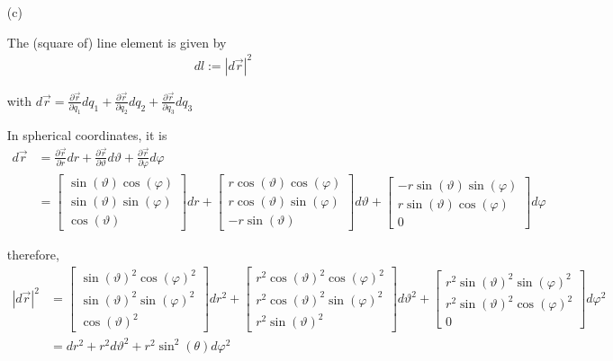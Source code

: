 \documentclass[11pt,a4paper]{article}
\begin{document}
\newpage

\begin{enumerate}
\item[(c)]

The (square of) line element is given by
\begin{align*}
dl:=|d\vec{r}|^2
\end{align*}

with $d\vec{r}=\frac{\partial\vec{r}}{\partial q_1}dq_1+\frac{\partial\vec{r}}{\partial q_2}dq_2+\frac{\partial\vec{r}}{\partial q_3}dq_3$

In spherical coordinates, it is
\begin{align*}
d\vec{r}
&=\frac{\partial\vec{r}}{\partial r}dr+\frac{\partial\vec{r}}{\partial \vartheta}d\vartheta+\frac{\partial\vec{r}}{\partial \varphi}d\varphi \\
&=
\begin{bmatrix}
\sin(\vartheta)\cos(\varphi) \\
\sin(\vartheta)\sin(\varphi) \\
\cos(\vartheta)
\end{bmatrix}
dr
+
\begin{bmatrix}
r\cos(\vartheta)\cos(\varphi) \\
r\cos(\vartheta)\sin(\varphi) \\
-r\sin(\vartheta)
\end{bmatrix}
d\vartheta
+
\begin{bmatrix}
-r\sin(\vartheta)\sin(\varphi) \\
r\sin(\vartheta)\cos(\varphi) \\
0
\end{bmatrix}
d\varphi
\end{align*}

therefore,
\begin{align*}
|d\vec{r}|^2
&=
\begin{bmatrix}
\sin(\vartheta)^2\cos(\varphi)^2 \\
\sin(\vartheta)^2\sin(\varphi)^2 \\
\cos(\vartheta)^2
\end{bmatrix}
dr^2
+
\begin{bmatrix}
r^2\cos(\vartheta)^2\cos(\varphi)^2 \\
r^2\cos(\vartheta)^2\sin(\varphi)^2 \\
r^2\sin(\vartheta)^2
\end{bmatrix}
d\vartheta^2
+
\begin{bmatrix}
r^2\sin(\vartheta)^2\sin(\varphi)^2 \\
r^2\sin(\vartheta)^2\cos(\varphi)^2 \\
0
\end{bmatrix}
d\varphi^2 \\
&=
dr^2+r^2d\vartheta^2+r^2\sin^2(\theta)d\varphi^2
\end{align*}


\end{enumerate}
\end{document}
